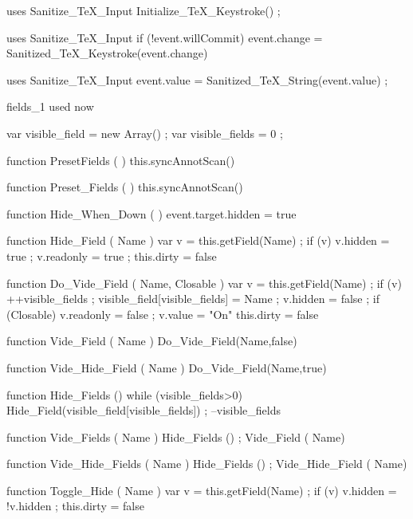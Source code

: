 \stopJSpreamble

 uses {Sanitize_TeX_Input}
  Initialize_TeX_Keystroke() ;
\stopJScode

 uses {Sanitize_TeX_Input}
  if (!event.willCommit)
    { event.change = Sanitized_TeX_Keystroke(event.change) }
\stopJScode

 uses {Sanitize_TeX_Input}
  event.value = Sanitized_TeX_String(event.value) ;
\stopJScode

\startJSpreamble fields_1 used now

var visible_field  = new Array() ; %
var visible_fields = 0 ;

function PresetFields ( )
  { this.syncAnnotScan() }

function Preset_Fields ( )
  { this.syncAnnotScan() }

function Hide_When_Down ( )
  { event.target.hidden = true }

function Hide_Field ( Name )
  { var v = this.getField(Name) ;
    if (v)
      { v.hidden = true ;
        v.readonly = true ;
        this.dirty = false } }

function Do_Vide_Field ( Name, Closable )
  { var v = this.getField(Name) ;
    if (v)
      { ++visible_fields ;
        visible_field[visible_fields] = Name ;
        v.hidden = false ;
        if (Closable)
          { v.readonly = false ;
            v.value = "On" }
        this.dirty = false } }

function Vide_Field ( Name )
  { Do_Vide_Field(Name,false) }

function Vide_Hide_Field ( Name )
  { Do_Vide_Field(Name,true) }

function Hide_Fields ()
  { while (visible_fields>0)
      { Hide_Field(visible_field[visible_fields]) ;
        --visible_fields } }

function Vide_Fields ( Name ) %
  { Hide_Fields () ;
    Vide_Field ( Name) }

function Vide_Hide_Fields ( Name ) %
  { Hide_Fields () ;
    Vide_Hide_Field ( Name) }

function Toggle_Hide ( Name )
  { var v = this.getField(Name) ;
    if (v)
      { v.hidden = !v.hidden ;
        this.dirty = false } }

